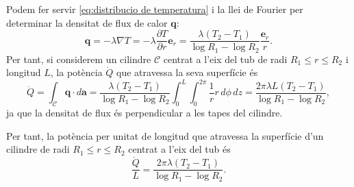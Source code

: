 \documentclass[12pt]{article}
\renewcommand{\vec}[1]{\mathbf{#1}}
\begin{document}
Podem fer servir \cref{eq:distribucio de temperatura} i la llei de Fourier per determinar la densitat de flux de calor \( \vec{q} \):
\begin{equation*}
	\vec{q} = -\lambda \nabla T = -\lambda \frac{\partial T}{\partial r} \vec{e}_r =  \frac{\lambda \left(T_2 - T_1\right)}{\log{R_1} - \log{R_2}} \frac{\vec{e}_r}{r} .
\end{equation*}
Per tant, si considerem un cilindre \( \mathcal{C} \) centrat a l'eix del tub de radi \( R_1 \leq r \leq R_2 \) i longitud \( L \), la potència \( \dot{Q} \) que atravessa la seva superfície és
\begin{equation*}
	\dot{Q} = \int_{\mathcal{C}} \vec{q} \cdot d\vec{a} = \frac{\lambda \left(T_2 - T_1\right)}{\log{R_1} - \log{R_2}} \int_0^L \int_0^{2\pi} \frac{1}{r} r \, d\phi \, dz = \frac{2\pi \lambda L \left(T_2 - T_1\right)}{\log{R_1} - \log{R_2}} ,
\end{equation*}
ja que la densitat de flux és perpendicular a les tapes del cilindre. 

Per tant, la potència per unitat de longitud que atravessa la superfície d'un cilindre de radi \( R_1 \leq r \leq R_2 \) centrat a l'eix del tub és 
\begin{equation*}
	\frac{\dot{Q}}{L} = \frac{2\pi\lambda \left(T_2 - T_1\right)}{\log{R_1} - \log{R_2}}.
\end{equation*}
\end{document}
